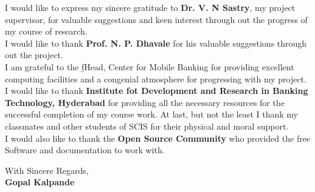 I would like to express my sincere gratitude to {\bf Dr. V. N Sastry}, my project supervisor, 
for valuable suggestions and keen interest through out the progress of my course of research. \\

I would like to thank {\bf Prof. N. P. Dhavale} for his valuable suggestions through out the project.\\

I am grateful to the {\b fHead, Center for Mobile Banking} for providing excellent computing facilities 
and a congenial atmosphere for progressing with my project. \\

I would like to thank {\bf Institute fot Development and Research in Banking Technology, Hyderabad} for providing all the necessary resources for the successful completion of my course work. At last, but not the least I thank my classmates and 
other students of SCIS for their physical and moral support. \\

I would also like to thank the {\bf Open Source Community} who provided the free Software and documentation to work with.

\vspace{0.7in}

\begin{flushright}
With Sincere Regards,\\
{\bf Gopal Kalpande}
\end{flushright}

